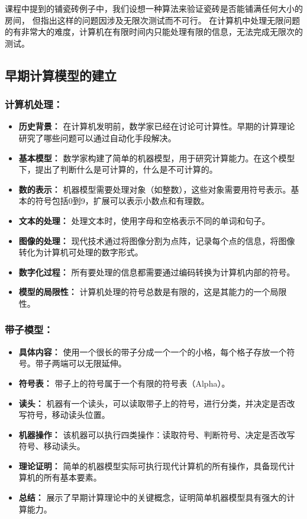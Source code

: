 \documentclass[UTF-8,a4paper,9pt]{article}
\begin{document}
课程中提到的铺瓷砖例子中，我们设想一种算法来验证瓷砖是否能铺满任何大小的房间，
但指出这样的问题因涉及无限次测试而不可行。
在计算机中处理无限问题的有非常大的难度，计算机在有限时间内只能处理有限的信息，无法完成无限次的测试。

\subsection{早期计算模型的建立}
\subsubsection*{\textbf{计算机处理：}}
\begin{itemize}
  \item \textbf{历史背景：} 在计算机发明前，数学家已经在讨论可计算性。早期的计算理论研究了哪些问题可以通过自动化手段解决。
  \item \textbf{基本模型：} 数学家构建了简单的机器模型，用于研究计算能力。在这个模型下，提出了判断什么是可计算的，什么是不可计算的。
  \item \textbf{数的表示：} 机器模型需要处理对象（如整数），这些对象需要用符号表示。基本的符号包括0到9，扩展可以表示小数点和有理数。
  \item \textbf{文本的处理：} 处理文本时，使用字母和空格表示不同的单词和句子。
  \item \textbf{图像的处理：} 现代技术通过将图像分割为点阵，记录每个点的信息，将图像转化为计算机可处理的数字形式。
  \item \textbf{数字化过程：} 所有要处理的信息都需要通过编码转换为计算机内部的符号。
  \item \textbf{模型的局限性：} 计算机处理的符号总数是有限的，这是其能力的一个局限性。
\end{itemize}

\subsubsection*{\textbf{带子模型：}}
\begin{itemize}
  \item \textbf{具体内容：} 使用一个很长的带子分成一个一个的小格，每个格子存放一个符号。带子两端可以无限延伸。
  \item \textbf{符号表：} 带子上的符号属于一个有限的符号表（Alpha）。
  \item \textbf{读头：} 机器有一个读头，可以读取带子上的符号，进行分类，并决定是否改写符号，移动读头位置。
  \item \textbf{机器操作：} 该机器可以执行四类操作：读取符号、判断符号、决定是否改写符号、移动读头。
  \item \textbf{理论证明：} 简单的机器模型实际可执行现代计算机的所有操作，具备现代计算机的所有基本要素。
  \item \textbf{总结：} 展示了早期计算理论中的关键概念，证明简单机器模型具有强大的计算能力。
\end{itemize}
\end{document}
